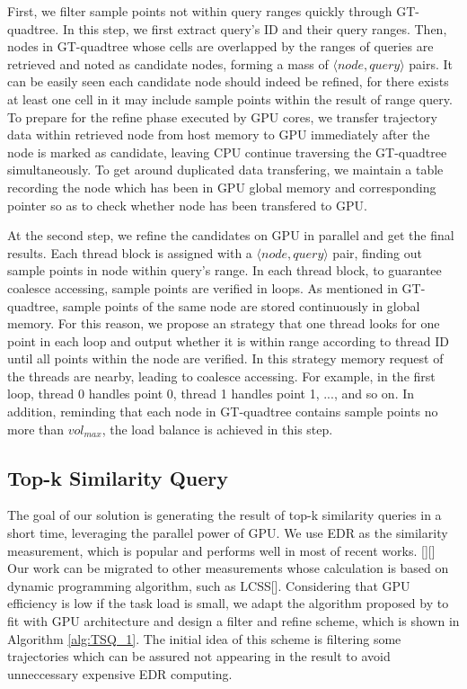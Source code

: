 \documentclass[conference]{IEEEtran}
\begin{document}
First, we filter sample points not within query ranges quickly through GT-quadtree. In this step, we first extract query's ID and their query ranges. Then, nodes in GT-quadtree whose cells are overlapped by the ranges of queries are retrieved and noted as candidate nodes, forming a mass of $\langle node, query\rangle $  pairs. It can be easily seen each candidate node should indeed be refined, for there exists at least one cell in it may include sample points within the result of range query. To prepare for the refine phase executed by GPU cores, we transfer trajectory data within retrieved node from host memory to GPU immediately after the node is marked as candidate, leaving CPU continue traversing the GT-quadtree simultaneously. To get around duplicated data transfering, we maintain a table recording the node which has been in GPU global memory and corresponding pointer so as to check whether node has been transfered to GPU.

At the second step, we refine the candidates on GPU in parallel and get the final results. Each thread block is assigned with a $\langle node, query\rangle $ pair, finding out sample points in node within query's range. In each thread block, to guarantee coalesce accessing, sample points are verified in loops. As mentioned in GT-quadtree, sample points of the same node are stored continuously in global memory. For this reason, we propose an strategy that one thread looks for one point in each loop and output whether it is within range according to thread ID until all points within the node are verified. In this strategy memory request of the threads are nearby, leading to coalesce accessing. For example, in the first loop, thread 0 handles point 0, thread 1 handles point 1, ..., and so on. In addition, reminding that each node in GT-quadtree contains sample points no more than $vol_{max}$, the load balance is achieved in this step.


\subsection{Top-k Similarity Query}

The goal of our solution is generating the result of top-k similarity queries in a short time, leveraging the parallel power of GPU. We use EDR as the similarity measurement, which is popular and performs well in most of recent works. [][] Our work can be migrated to other measurements whose calculation is based on dynamic programming algorithm, such as LCSS[]. Considering that GPU efficiency is low if the task load is small, we adapt the algorithm proposed by \cite{DBLP:conf/sigmod/ChenOO05} to fit with GPU architecture and design a filter and refine scheme, which is shown in Algorithm \ref{alg:TSQ_1}. The initial idea of this scheme is filtering some trajectories which can be assured not appearing in the result to avoid unneccessary expensive EDR computing. 
\end{document}
